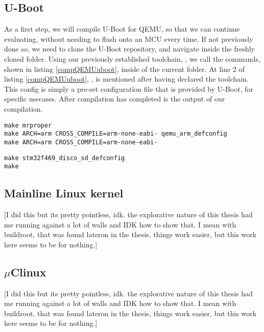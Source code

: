 \subsection{U-Boot}
As a first step, we will compile U-Boot for QEMU, so that we can continue evaluating, without needing to flash onto an MCU every time. If not previously done so, we need to clone the U-Boot repository, and navigate inside the freshly cloned folder. Using our previously established toolchain, , we call the commands, shown in listing \ref{compQEMUuboot}, inside of the current folder. At line 2 of listing \ref{compQEMUuboot}, , is mentioned after having declared the toolchain. This config is simply a pre-set configuration file that is provided by U-Boot, for specific usecases. After compilation has completed  is the output of our compilation.

\begin{lstlisting}[style=SH, caption=Compiling U-Boot for QEMU, label=compQEMUuboot]
make mrproper
make ARCH=arm CROSS_COMPILE=arm-none-eabi- qemu_arm_defconfig
make ARCH=arm CROSS_COMPILE=arm-none-eabi-
\end{lstlisting}

\begin{lstlisting}[style=SH, caption=Compiling U-Boot for QEMU, label=compQEMUuboot]
make stm32f469_disco_sd_defconfig
make
\end{lstlisting}

\subsection{Mainline Linux kernel}

[I did this but its pretty pointless, idk. the explorative nature of this thesis had me running against a lot of walls and IDK how to show that. I mean with buildroot, that was found lateron in the thesis, things work easier, but this work here seems to be for nothing.]

\subsection{$\mu$Clinux}

[I did this but its pretty pointless, idk. the explorative nature of this thesis had me running against a lot of walls and IDK how to show that. I mean with buildroot, that was found lateron in the thesis, things work easier, but this work here seems to be for nothing.]


